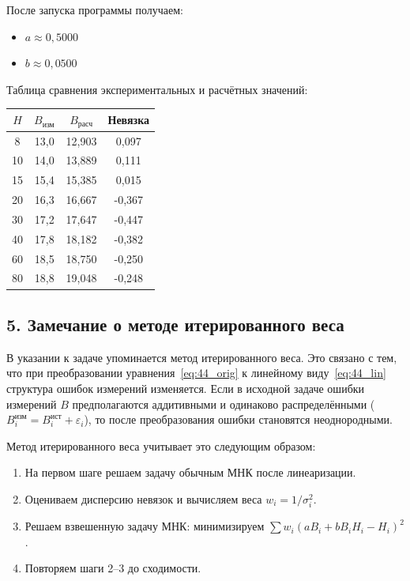 \documentclass{article}
\begin{document}
После запуска программы получаем:
\begin{itemize}
\item $a \approx 0{,}5000$
\item $b \approx 0{,}0500$
\end{itemize}

Таблица сравнения экспериментальных и расчётных значений:

\begin{center}
\begin{tabular}{|c|c|c|c|}
\hline
$H$ & $B_{\text{изм}}$ & $B_{\text{расч}}$ & Невязка \\
\hline
8 & 13,0 & 12,903 & 0,097 \\
10 & 14,0 & 13,889 & 0,111 \\
15 & 15,4 & 15,385 & 0,015 \\
20 & 16,3 & 16,667 & -0,367 \\
30 & 17,2 & 17,647 & -0,447 \\
40 & 17,8 & 18,182 & -0,382 \\
60 & 18,5 & 18,750 & -0,250 \\
80 & 18,8 & 19,048 & -0,248 \\
\hline
\end{tabular}
\end{center}

\subsection*{5. Замечание о методе итерированного веса}

В указании к задаче упоминается метод итерированного веса. Это связано с тем, что при преобразовании уравнения~\eqref{eq:44_orig} к линейному виду~\eqref{eq:44_lin} структура ошибок измерений изменяется. Если в исходной задаче ошибки измерений $B$ предполагаются аддитивными и одинаково распределёнными ($B_i^{\text{изм}} = B_i^{\text{ист}} + \varepsilon_i$), то после преобразования ошибки становятся неоднородными.

Метод итерированного веса учитывает это следующим образом:
\begin{enumerate}
\item На первом шаге решаем задачу обычным МНК после линеаризации.
\item Оцениваем дисперсию невязок и вычисляем веса $w_i = 1/\sigma_i^2$.
\item Решаем взвешенную задачу МНК: минимизируем $\sum w_i (a B_i + b B_i H_i - H_i)^2$.
\item Повторяем шаги 2--3 до сходимости.
\end{enumerate}
\end{document}
